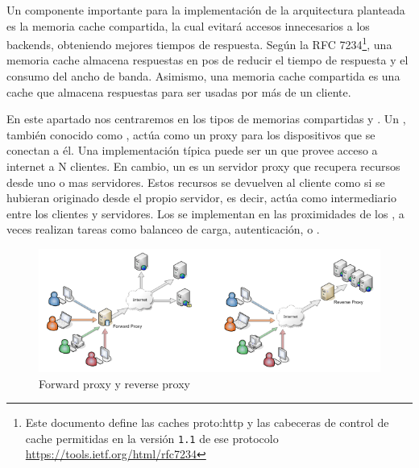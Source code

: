 Un componente importante para la implementación de la arquitectura planteada es la memoria cache compartida, la cual evitará accesos innecesarios a los backends, obteniendo mejores tiempos de respuesta.  Según la RFC 7234\footnote{Este documento define las caches \gls{proto:http} y las cabeceras de control de cache permitidas en la versión \texttt{1.1} de ese protocolo\\\url{https://tools.ietf.org/html/rfc7234}}, una memoria cache almacena respuestas en pos de reducir el tiempo de respuesta y el consumo del ancho de banda. Asimismo, una memoria cache compartida es una cache que almacena respuestas para ser usadas por más de un cliente.

En este apartado nos centraremos en los tipos de memorias compartidas  y .  Un , también conocido como , actúa como un proxy para los dispositivos que se conectan a él.  Una implementación típica puede ser un  que provee acceso a internet a N clientes.
En cambio, un  es un servidor proxy que recupera recursos desde uno o mas servidores.  Estos recursos se devuelven al cliente como si se hubieran originado desde el propio servidor, es decir, actúa como intermediario entre los clientes y servidores.  Los  se implementan en las proximidades de los , a veces realizan tareas como balanceo de carga, autenticación, o .

\begin{figure}[H]
  \includegraphics[width=\linewidth]{src/images/03-capitulo-3/tecnologias/squid/forward-reverse-proxy.png}
  \caption{Forward proxy y reverse proxy}
  \label{fig:varnish}
\end{figure}
